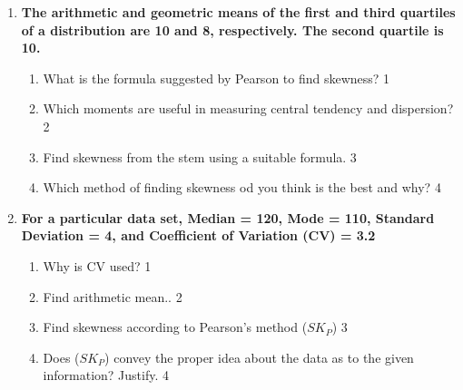 \documentclass[a4paper,oneside]{book}
\begin{document}
\begin{enumerate}
   \item
	  \textbf{The arithmetic and geometric means of the first and third quartiles of a distribution are 10 and 8, respectively. The second quartile is 10.} 
  
  \begin{enumerate}
    \item
	What is the formula suggested by Pearson to find skewness? \hfill 1
    \item
	Which moments are useful in measuring central tendency and dispersion?  \hfill 2
    \item  
	Find skewness from the stem using a suitable formula. \hfill 3
    \item
	Which method of finding skewness od you think is the best and why? \hfill 4
\end{enumerate}

 \item
	  \textbf{For a particular data set, Median = 120, Mode = 110, Standard Deviation = 4, and Coefficient of Variation (CV)  = 3.2} 
  
  \begin{enumerate}
    \item
	Why is  CV used?  \hfill 1
    \item
	Find arithmetic mean.. \hfill 2
    \item  
	Find skewness according to Pearson's method ($SK_P$) \hfill 3
    \item
	Does ($SK_P$) convey the proper idea about the data as to the given information? Justify. \hfill 4
  \end{enumerate}
  \end{enumerate}
\end{document}
